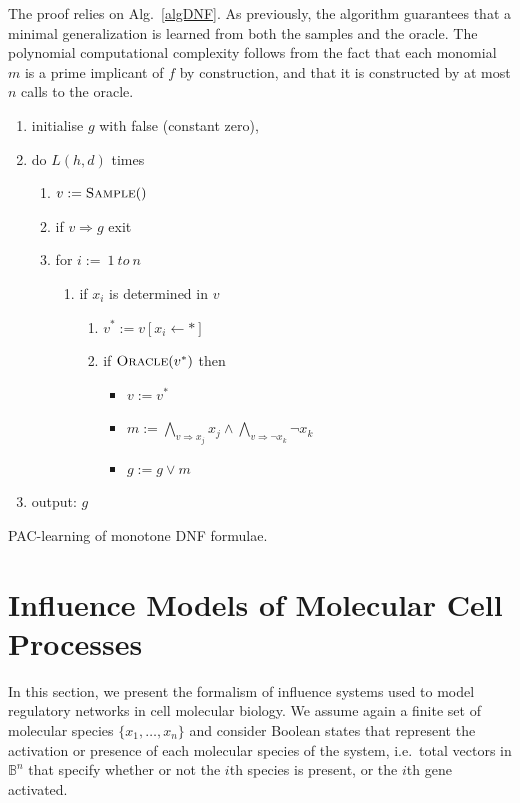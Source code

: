 \documentclass{llncs}
\begin{document}
The proof relies on Alg.~\ref{algDNF}. As previously, the algorithm guarantees that a minimal generalization is learned from both the samples and the oracle.
The polynomial computational complexity follows from the fact that each monomial $m$ is a prime implicant
of $f$ by construction, and that it is constructed by at most $n$ calls to the
oracle.

\begin{algorithm}
\begin{enumerate}
\item initialise $g$ with false (constant zero),
\item
do $L(h,d)$ times 
\begin{enumerate}
\item $v:=\textsc{Sample}()$
	\item 
	if $v\Rightarrow g$ exit
\item for $i:=\ 1\ to \ n$
\begin{enumerate}
\item if $x_i$ is determined in $v$
\begin{enumerate}
\item $v^*:=v[x_i\leftarrow *]$
\item if $\textsc{Oracle}(v^*)$ then 
\begin{itemize}
\item $v:=v^*$
\item $m:=\bigwedge_{v\Rightarrow x_j} x_j\wedge\bigwedge_{v\Rightarrow\neg x_k}\neg x_k$ 
\item $g:=g\vee m$
\end{itemize}
\end{enumerate}
\end{enumerate}
\end{enumerate}
\item output: $g$
\end{enumerate}
\caption{PAC-learning of monotone DNF formulae.\label{algDNF}}
\end{algorithm}





\section{Influence Models of Molecular Cell Processes}

In this section, we present the formalism of influence systems used to model regulatory networks in cell molecular biology.
We assume again a finite set of molecular species $\{x_1,\dots,x_n\}$ 
and consider Boolean states that represent the activation or presence of each molecular species of the system, 
i.e.~total vectors in $\mathbb{B}^n$ that specify whether or not the $i$th species is present, or the $i$th gene activated.
\end{document}
